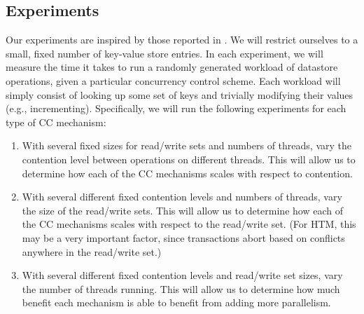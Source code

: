 \subsection{Experiments}
Our experiments are inspired by those reported in \citep{tran2010}. We will
restrict ourselves to a small, fixed number of key-value store entries. In each
experiment, we will measure the time it takes to run a randomly generated
workload of datastore operations, given a particular concurrency control
scheme. Each workload will simply consist of looking up some set of keys and
trivially modifying their values (e.g., incrementing). Specifically, we will run
the following experiments for each type of CC mechanism:

\begin{enumerate}
\item With several fixed sizes for read/write sets and numbers of threads, vary the contention level between operations on different threads. This will allow us to determine how each of the CC mechanisms scales with respect to contention.
\item With several different fixed contention levels and numbers of threads, vary the size of the read/write sets. This will allow us to determine how each of the CC mechanisms scales with respect to the read/write set. (For HTM, this may be a very important factor, since transactions abort based on conflicts anywhere in the read/write set.)
\item With several different fixed contention levels and read/write set sizes,
    vary the number of threads running. This will allow us to determine how much benefit each mechanism is able to benefit from adding more parallelism.
\end{enumerate}

